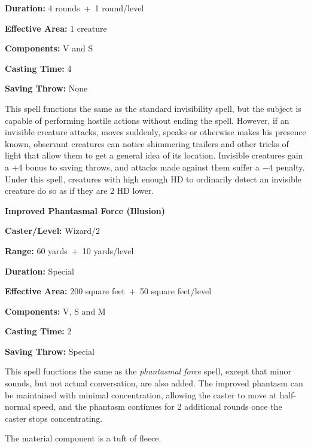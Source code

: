 \begin{multicols}{2}
\begin{minipage}{\columnwidth}
\noindent \textbf{Duration:} 4 rounds~+~1 round/level

\noindent \textbf{Effective Area:} 1 creature

\noindent \textbf{Components:} V and S

\noindent \textbf{Casting Time:} 4

\noindent \textbf{Saving Throw:} None

\end{minipage}

This spell functions the same as the standard invisibility spell, but the subject is capable of performing hostile actions without ending the spell.  However, if an invisible creature attacks, moves suddenly, speaks or otherwise makes his presence known, observant creatures can notice shimmering trailers and other tricks of light that allow them to get a general idea of its location.  Invisible creatures gain a +4 bonus to saving throws, and attacks made against them suffer a $-4$ penalty.  Under this spell, creatures with high enough HD to ordinarily detect an invisible creature do so as if they are 2 HD lower.

\vspace{1em}

\noindent
\begin{minipage}{\columnwidth}

\noindent \textbf{Improved Phantasmal Force (Illusion)}

\noindent \textbf{Caster/Level:} Wizard/2

\noindent \textbf{Range:} 60 yards~+~10 yards/level

\noindent \textbf{Duration:} Special

\noindent \textbf{Effective Area:} 200 square feet~+~50 square feet/level

\noindent \textbf{Components:} V, S and M

\noindent \textbf{Casting Time:} 2

\noindent \textbf{Saving Throw:} Special

\end{minipage}

This spell functions the same as the \textit{phantasmal force} spell, except that minor sounds, but not actual conversation, are also added.  The improved phantasm can be maintained with minimal concentration, allowing the caster to move at half-normal speed, and the phantasm continues for 2 additional rounds once the caster stops concentrating.

The material component is a tuft of fleece.  


\end{multicols}
